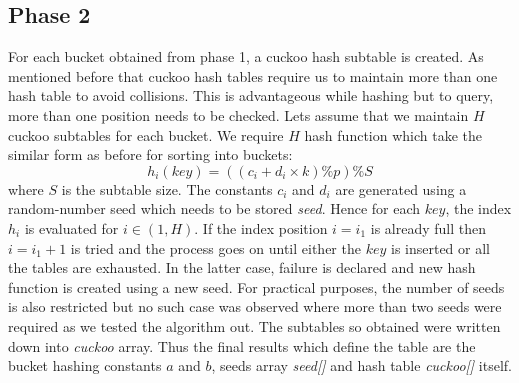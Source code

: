 \documentclass[a4paper,12pt]{report}
\begin{document}
\subsection{Phase 2}
For each bucket obtained from phase 1, a cuckoo hash subtable is created. As mentioned before that cuckoo hash tables 
require us to maintain more than one hash table to avoid collisions. This is advantageous while hashing but to query, 
more than one position needs to be checked. Lets assume that we maintain $H$ cuckoo subtables for each bucket. 
We require $H$ hash function which take the similar form as before for sorting into buckets:
$$h_i(key) = ((c_i+d_i \times k) \% p ) \% S$$
where $S$ is the subtable size. The constants $c_i$ and $d_i$ are generated using a random-number seed which needs 
to be stored \textit{seed}. Hence for each $key$, the index $h_i$ is evaluated for $ i \in (1,H)$. If the index 
position $i = i_1$ is already full then $i= i_1+1$ is tried and the process goes on until either the $key$ is inserted
 or all the tables are exhausted. In the latter case, failure is declared and new hash function is created using a new 
seed. For practical purposes, the number of seeds is also restricted but no such case was observed where more than two 
seeds were required as we tested the algorithm out. The subtables so obtained were written down into \textit{cuckoo}
 array. Thus the final results which define the table are the bucket hashing constants $a$ and $b$, seeds array 
\textit{seed[]} and hash table \textit{cuckoo[]} itself. 
\end{document}

